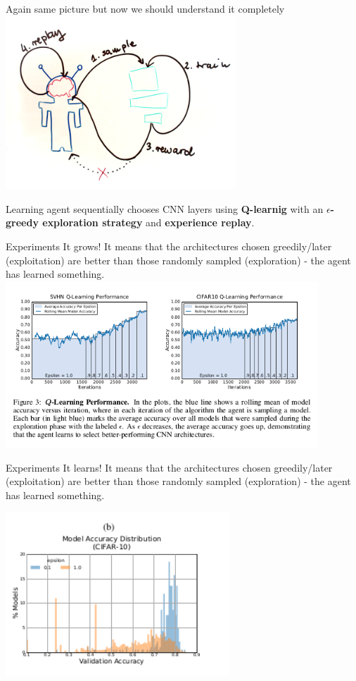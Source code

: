 \documentclass[15pt]{beamer}
\begin{document}
\begin{frame}{Again same picture but now we should understand it completely}
  \centering
  \includegraphics[width=0.65\textwidth]{model.png}  
  
  \raggedright
  Learning agent sequentially chooses CNN layers using \textbf{Q-learnig} with an \textbf{$\epsilon$-greedy exploration strategy} and \textbf{experience replay}.
\end{frame}

\begin{frame}{Experiments}
It grows! It means that the architectures chosen greedily/later (exploitation) are better than those randomly sampled (exploration) - the agent has learned something.
\includegraphics[width=0.88\textwidth]{experiments.png}
\end{frame}

\begin{frame}{Experiments}
It learns! It means that the architectures chosen greedily/later (exploitation) are better than those randomly sampled (exploration) - the agent has learned something.
\begin{center}
\includegraphics[width=0.63\textwidth]{exp2.png}
\end{center}
\end{frame}
\end{document}
